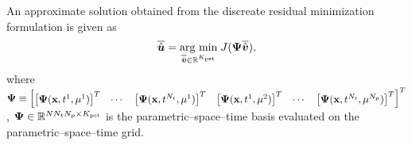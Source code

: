 \documentclass[3p,computermodern,10pt]{elsarticle}
\begin{document}
An approximate solution obtained from the discreate residual minimization formulation is given as
\begin{equation}\label{eq:discrete_minimization_principle_solution}
\overline{\hat{\boldsymbol u}} = \underset{\overline{\hat{\boldsymbol v}} \in \mathbb{R}^{K_{\text{pst}}} }{\text{arg min} } \; J( \mathbf{ \Psi} \overline{\hat{\boldsymbol v}}),
\end{equation}
where $\mathbf{ \Psi} \equiv \begin{bmatrix} \left[ \boldsymbol \Psi(\mathbf{x},t^1,\mathbf{\mu}^1)\right]^T & \cdots & \left[\boldsymbol \Psi(\mathbf{x},t^{N_t},\mathbf{\mu}^1) \right]^T & \left[ \boldsymbol \Psi(\mathbf{x},t^1,\mathbf{\mu}^2) \right]^T & \cdots & \left[\boldsymbol \Psi(\mathbf{x},t^{N_t},\mathbf{\mu}^{N_p}) \right]^T \end{bmatrix}^T$, $\mathbf{ \Psi}  \in \mathbb{R}^{N N_t N_p \times K_{\text{pst}}}$ is the parametric--space--time basis evaluated on the parametric--space--time grid.

\end{document}
